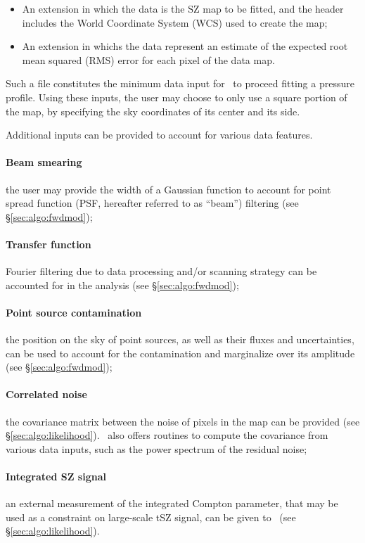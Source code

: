 \begin{itemize}[leftmargin=*]
    \item An extension in which the data is the SZ map to be fitted, and the header includes the World Coordinate System (WCS) used to create the map;
    \item An extension in whichs the data represent an estimate of the expected root mean squared (RMS) error for each pixel of the data map.
\end{itemize}

Such a file constitutes the minimum data input for \panco\ to proceed fitting a pressure profile.
Using these inputs, the user may choose to only use a square portion of the map, by specifying the sky coordinates of its center and its side.

Additional inputs can be provided to account for various data features.
\paragraph{Beam smearing} the user may provide the width of a Gaussian function to account for point spread function (PSF, hereafter referred to as ``beam'') filtering (see \S\ref{sec:algo:fwdmod});
\paragraph{Transfer function} Fourier filtering due to data processing and/or scanning strategy can be accounted for in the analysis (see \S\ref{sec:algo:fwdmod});
\paragraph{Point source contamination} the position on the sky of point sources, as well as their fluxes and uncertainties, can be used to account for the contamination and marginalize over its amplitude (see \S\ref{sec:algo:fwdmod});
\paragraph{Correlated noise} the covariance matrix between the noise of pixels in the map can be provided (see \S\ref{sec:algo:likelihood}).
\panco\ also offers routines to compute the covariance from various data inputs, such as the power spectrum of the residual noise;
\paragraph{Integrated SZ signal} an external measurement of the integrated Compton parameter, that may be used as a constraint on large-scale tSZ signal, can be given to \panco\ (see \S\ref{sec:algo:likelihood}).


